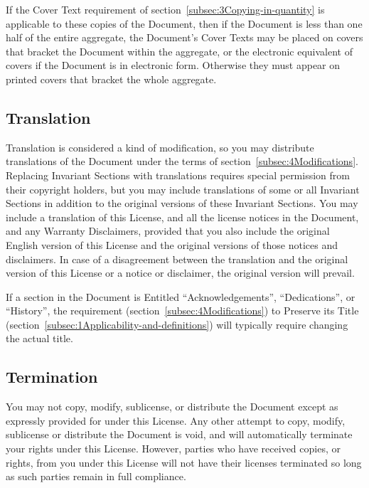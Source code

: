 {\tiny{}If the Cover Text requirement of section~\ref{subsec:3Copying-in-quantity}
is applicable to these copies of the Document, then if the Document
is less than one half of the entire aggregate, the Document's Cover
Texts may be placed on covers that bracket the Document within the
aggregate, or the electronic equivalent of covers if the Document
is in electronic form. Otherwise they must appear on printed covers
that bracket the whole aggregate.}{\tiny\par}

\subsection*{{\tiny{}Translation}}

{\tiny{}Translation is considered a kind of modification, so you may
distribute translations of the Document under the terms of section~\ref{subsec:4Modifications}.
Replacing Invariant Sections with translations requires special permission
from their copyright holders, but you may include translations of
some or all Invariant Sections in addition to the original versions
of these Invariant Sections. You may include a translation of this
License, and all the license notices in the Document, and any Warranty
Disclaimers, provided that you also include the original English version
of this License and the original versions of those notices and disclaimers.
In case of a disagreement between the translation and the original
version of this License or a notice or disclaimer, the original version
will prevail.}{\tiny\par}

{\tiny{}If a section in the Document is Entitled \textquotedblleft Acknowledgements\textquotedblright ,
\textquotedblleft Dedications\textquotedblright , or \textquotedblleft History\textquotedblright ,
the requirement (section~\ref{subsec:4Modifications}) to Preserve
its Title (section~\ref{subsec:1Applicability-and-definitions})
will typically require changing the actual title.}{\tiny\par}

\subsection*{{\tiny{}Termination}}

{\tiny{}You may not copy, modify, sublicense, or distribute the Document
except as expressly provided for under this License. Any other attempt
to copy, modify, sublicense or distribute the Document is void, and
will automatically terminate your rights under this License. However,
parties who have received copies, or rights, from you under this License
will not have their licenses terminated so long as such parties remain
in full compliance.}{\tiny\par}

